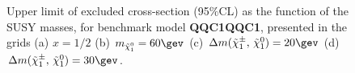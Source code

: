 \clearpage
\begin{figure}[h]
  \centering
    \caption{
    Upper limit of excluded cross-section (95$\%$CL) as the function of the SUSY masses, for benchmark model \textbf{QQC1QQC1}, presented in the grids (a) $x=1/2$ (b) $\mLSP=60\gev$ (c) $\dmc=20\gev$ (d) $\dmc=30\gev$.
    \label{fig::Result::xsecUL::QQC1QQC1} }
\end{figure}


